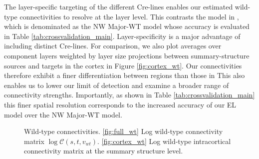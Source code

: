 The layer-specific targeting of the different Cre-lines enables our estimated wild-type connectivities to resolve at the layer level.
This contrasts the model in \citet{Knox2019-ot}, which is denominated as the NW Major-WT model whose accuracy is evaluated in Table \ref{tab:crossvalidation_main}.
Layer-specificity is a major advantage of including distinct Cre-lines.
For comparison, we also plot averages over component layers weighted by layer size projections between summary-structure sources and targets in the cortex in Figure \ref{fig:cortex_wt}.
Our connectivities therefore exhibit a finer differentiation between regions than those in \citet{Knox2019-ot}
This also enables us to lower our limit of detection and examine a broader range of connectivity strengths.
Importantly, as shown in Table \ref{tab:crossvalidation_main} this finer spatial resolution corresponds to the increased accuracy of our EL model over the NW Major-WT model.

\newpage

\begin{figure}[H]
\centering
        \newline
   \caption{Wild-type connectivities.
   \ref{fig:full_wt} Log wild-type connectivity matrix $\log \mathcal {C} (s,t,v_{wt})$.
   \ref{fig:cortex_wt} Log wild-type intracortical connectivity matrix at the summary structure level.}
   \label{fig:connectome}
\end{figure}

